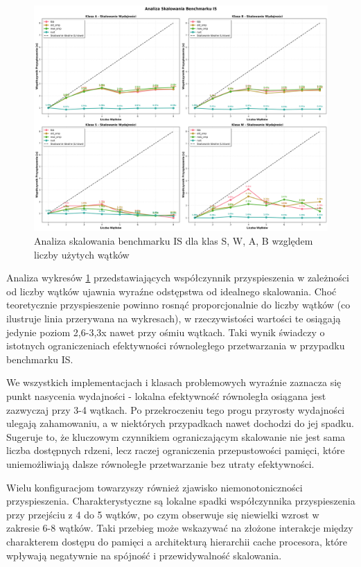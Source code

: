 \begin{figure}[H]
    \centering
    \includegraphics[width=\textwidth]{analiza/images/parallel/is/arm/is_analiza_skalowania.png}
    \caption{Analiza skalowania benchmarku IS dla klas S, W, A, B względem liczby użytych wątków}
    \label{is_analiza_skalowania}
\end{figure}

Analiza wykresów \ref{is_analiza_skalowania} przedstawiających współczynnik przyspieszenia w zależności od liczby wątków ujawnia wyraźne odstępstwa od idealnego skalowania. Choć teoretycznie przyspieszenie powinno rosnąć proporcjonalnie do liczby wątków (co ilustruje linia przerywana na wykresach), w rzeczywistości wartości te osiągają jedynie poziom 2,6-3,3x nawet przy ośmiu wątkach. Taki wynik świadczy o istotnych ograniczeniach efektywności równoległego przetwarzania w przypadku benchmarku IS.

We wszystkich implementacjach i klasach problemowych wyraźnie zaznacza się punkt nasycenia wydajności - lokalna efektywność równoległa osiągana jest zazwyczaj przy 3-4 wątkach. Po przekroczeniu tego progu przyrosty wydajności ulegają zahamowaniu, a w niektórych przypadkach nawet dochodzi do jej spadku. Sugeruje to, że kluczowym czynnikiem ograniczającym skalowanie nie jest sama liczba dostępnych rdzeni, lecz raczej ograniczenia przepustowości pamięci, które uniemożliwiają dalsze równoległe przetwarzanie bez utraty efektywności.

Wielu konfiguracjom towarzyszy również zjawisko niemonotoniczności przyspieszenia. Charakterystyczne są lokalne spadki współczynnika przyspieszenia przy przejściu z 4 do 5 wątków, po czym obserwuje się niewielki wzrost w zakresie 6-8 wątków. Taki przebieg może wskazywać na złożone interakcje między charakterem dostępu do pamięci a architekturą hierarchii cache procesora, które wpływają negatywnie na spójność i przewidywalność skalowania.

